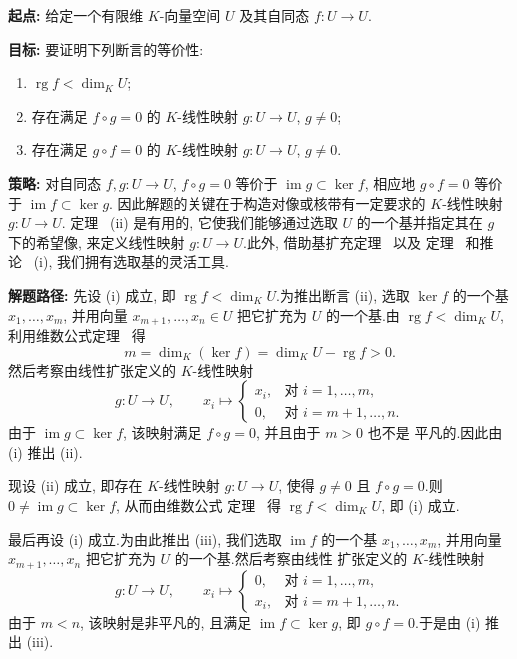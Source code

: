 \noindent\textbf{起点:} 给定一个有限维 $K$-向量空间 $U$ 及其自同态 $f \colon U \longrightarrow U$.

\noindent\textbf{目标:} 要证明下列断言的等价性:
\begin{enumerate}
\item[(i)] $\operatorname{rg} f < \dim_K U$;
\item[(ii)] 存在满足 $f \circ g = 0$ 的 $K$-线性映射 $g \colon U \longrightarrow U$, $g \neq 0$;
\item[(iii)] 存在满足 $g \circ f = 0$ 的 $K$-线性映射 $g \colon U \longrightarrow U$, $g \neq 0$.
\end{enumerate}

\noindent\textbf{策略:} 对自同态 $f, g \colon U \longrightarrow U$, $f \circ g = 0$ 等价于
$\operatorname{im} g \subset \ker f$, 相应地 $g \circ f = 0$ 等价于 $\operatorname{im} f \subset \ker g$.
因此解题的关键在于构造对像或核带有一定要求的 $K$-线性映射 $g \colon U \longrightarrow U$.
定理~ (ii) 是有用的, 它使我们能够通过选取 $U$ 的一个基并指定其在 $g$ 下的希望像,
来定义线性映射 $g \colon U \longrightarrow U$.此外, 借助基扩充定理~ 以及
定理~ 和推论~ (i), 我们拥有选取基的灵活工具.

\noindent\textbf{解题路径:} 先设 (i) 成立, 即 $\operatorname{rg} f < \dim_K U$.为推出断言 (ii),
选取 $\ker f$ 的一个基 $x_1, \ldots, x_m$, 并用向量 $x_{m+1}, \ldots, x_n \in U$ 把它扩充为
$U$ 的一个基.由 $\operatorname{rg} f < \dim_K U$, 利用维数公式定理~ 得
\[
m = \dim_K(\ker f) = \dim_K U - \operatorname{rg} f > 0\text{.}
\]
然后考察由线性扩张定义的 $K$-线性映射
\[
g \colon U \longrightarrow U, \qquad x_i \longmapsto \begin{cases} x_i, & \text{对 } i = 1, \ldots, m, \\ 0, & \text{对 } i = m + 1, \ldots, n\text{.} \end{cases}
\]
由于 $\operatorname{im} g \subset \ker f$, 该映射满足 $f \circ g = 0$, 并且由于 $m > 0$ 也不是
平凡的.因此由 (i) 推出 (ii).

现设 (ii) 成立, 即存在 $K$-线性映射 $g \colon U \longrightarrow U$, 使得 $g \neq 0$ 且
$f \circ g = 0$.则 $0 \neq \operatorname{im} g \subset \ker f$, 从而由维数公式
定理~ 得 $\operatorname{rg} f < \dim_K U$, 即 (i) 成立.

最后再设 (i) 成立.为由此推出 (iii), 我们选取 $\operatorname{im} f$ 的一个基
$x_1, \ldots, x_m$, 并用向量 $x_{m+1}, \ldots, x_n$ 把它扩充为 $U$ 的一个基.然后考察由线性
扩张定义的 $K$-线性映射
\[
g \colon U \longrightarrow U, \qquad x_i \longmapsto \begin{cases} 0, & \text{对 } i = 1, \ldots, m, \\ x_i, & \text{对 } i = m + 1, \ldots, n\text{.} \end{cases}
\]
由于 $m < n$, 该映射是非平凡的, 且满足 $\operatorname{im} f \subset \ker g$, 即
$g \circ f = 0$.于是由 (i) 推出 (iii).

